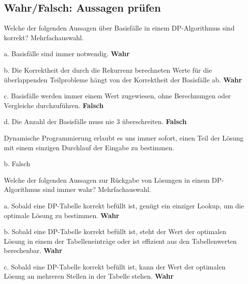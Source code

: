 \subsection{Wahr/Falsch: Aussagen prüfen}\label{sec:13-wahr-oder-falsch}
\begin{contentbox}
Welche der folgenden Aussagen über Basisfälle in einem DP-Algorithmus sind korrekt? Mehrfachauswahl.
\begin{factlist}
    \item a. Basisfälle sind immer notwendig. \textbf{Wahr}
    \item b. Die Korrektheit der durch die Rekurrenz berechneten Werte für die überlappenden Teilprobleme hängt von der Korrektheit der Basisfälle ab. \textbf{Wahr}
    \item c. Basisfälle werden immer einem Wert zugewiesen, ohne Berechnungen oder Vergleiche durchzuführen. \textbf{Falsch}
    \item d. Die Anzahl der Basisfälle muss nie 3 überschreiten. \textbf{Falsch}
\end{factlist}
\end{contentbox}

\begin{contentbox}
Dynamische Programmierung erlaubt es uns immer sofort, einen Teil der Lösung mit einem einzigen Durchlauf der Eingabe zu bestimmen.
\begin{factlist}
    \item b. Falsch
\end{factlist}
\end{contentbox}

\begin{contentbox}
Welche der folgenden Aussagen zur Rückgabe von Lösungen in einem DP-Algorithmus sind immer wahr? Mehrfachauswahl.
\begin{factlist}
    \item a. Sobald eine DP-Tabelle korrekt befüllt ist, genügt ein einziger Lookup, um die optimale Lösung zu bestimmen. \textbf{Wahr}
    \item b. Sobald eine DP-Tabelle korrekt befüllt ist, steht der Wert der optimalen Lösung in einem der Tabelleneinträge oder ist effizient aus den Tabellenwerten berechenbar. \textbf{Wahr}
    \item c. Sobald eine DP-Tabelle korrekt befüllt ist, kann der Wert der optimalen Lösung an mehreren Stellen in der Tabelle stehen. \textbf{Wahr}
\end{factlist}
\end{contentbox}

